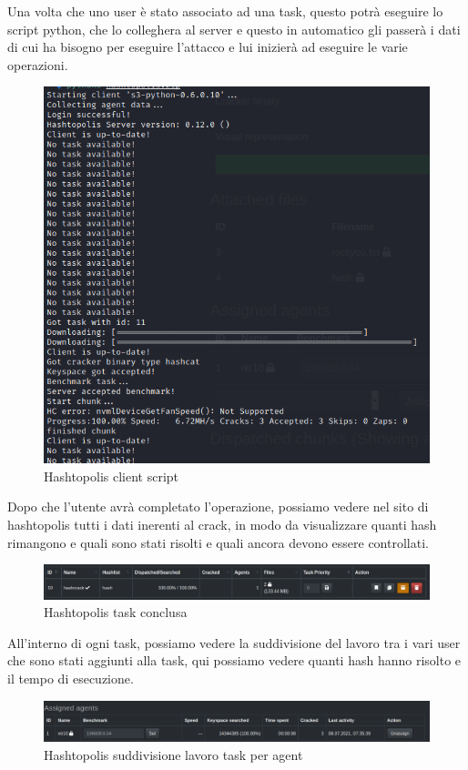 Una volta che uno user è stato associato ad una task, questo potrà eseguire lo script python, che lo colleghera al server e questo in automatico gli passerà i dati di cui ha bisogno per eseguire l'attacco e lui inizierà ad eseguire le varie operazioni.

\begin{figure}[ht]
    \centering
    \includegraphics[width=\linewidth]{Immagini/8/hashtopolis_8.png}
    \caption{Hashtopolis client script}
\end{figure}

Dopo che l'utente avrà completato l'operazione, possiamo vedere nel sito di hashtopolis tutti i dati inerenti al crack, in modo da visualizzare quanti hash rimangono e quali sono stati risolti e quali ancora devono essere controllati.

\begin{figure}[ht]
    \centering
    \includegraphics[width=\linewidth]{Immagini/8/hashtopolis_6.png}
    \caption{Hashtopolis task conclusa}
\end{figure}

All'interno di ogni task, possiamo vedere la suddivisione del lavoro tra i vari user che sono stati aggiunti alla task, qui possiamo vedere quanti hash hanno risolto e il tempo di esecuzione.
\newpage
\begin{figure}[ht]
    \centering
    \includegraphics[width=\linewidth]{Immagini/8/hashtopolis_9.png}
    \caption{Hashtopolis suddivisione lavoro task per agent}
\end{figure}

